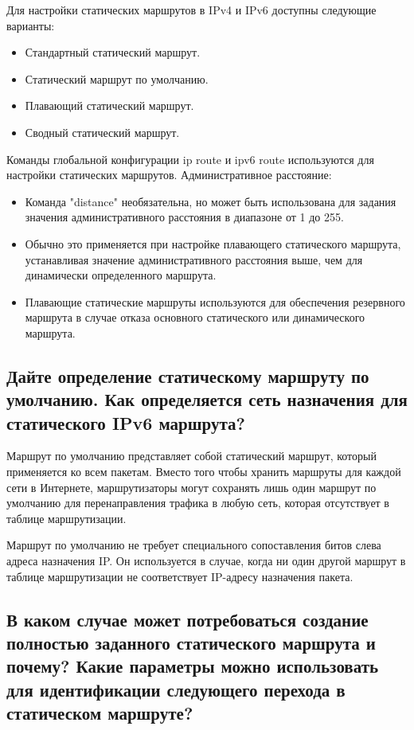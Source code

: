 Для настройки статических маршрутов в IPv4 и IPv6 доступны следующие варианты:

\begin{itemize}
    \item Стандартный статический маршрут.
    \item Статический маршрут по умолчанию.
    \item Плавающий статический маршрут.
    \item Сводный статический маршрут.
\end{itemize}

Команды глобальной конфигурации ip route и ipv6 route используются
для настройки статических маршрутов.
Административное расстояние:

\begin{itemize}
    \item Команда "distance" необязательна,
    но может быть использована для задания значения административного
    расстояния в диапазоне от 1 до 255.
    \item Обычно это применяется при настройке плавающего
    статического маршрута, устанавливая значение административного
    расстояния выше, чем для динамически определенного маршрута.
    \item Плавающие статические маршруты используются
    для обеспечения резервного маршрута в случае отказа основного
    статического или динамического маршрута.
\end{itemize}

\subsection{Дайте определение статическому маршруту по умолчанию.
Как определяется сеть назначения для статического IPv6 маршрута?}

Маршрут по умолчанию представляет собой статический маршрут,
который применяется ко всем пакетам.
Вместо того чтобы хранить маршруты для каждой сети в Интернете,
маршрутизаторы могут сохранять лишь один маршрут по умолчанию
для перенаправления трафика в любую сеть,
которая отсутствует в таблице маршрутизации.\par
Маршрут по умолчанию не требует специального сопоставления битов
слева адреса назначения IP. Он используется в случае,
когда ни один другой маршрут в таблице маршрутизации не соответствует
IP-адресу назначения пакета.

\subsection{В каком случае может потребоваться создание полностью заданного
статического маршрута и почему?
Какие параметры можно использовать для идентификации следующего перехода
в статическом маршруте?}

